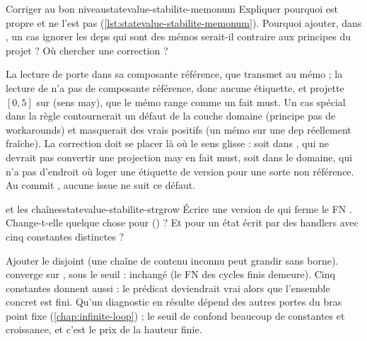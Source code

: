 \begin{exercice}{Corriger au bon niveau}{statevalue-stabilite-memonum}
  Expliquer pourquoi  est propre et
   ne l'est pas
  (\cref{lst:statevalue-stabilite-memonum}). Pourquoi ajouter, dans
  , un cas \og ignorer les deps qui sont des
  mémos\fg{} serait-il contraire aux principes du projet ? Où chercher une
  correction ?
\end{exercice}
\begin{solution}
  La lecture de  porte  dans sa composante
  référence, que  transmet au mémo ; la lecture de
   n'a pas de composante référence, donc aucune étiquette, et
   projette $[0,5]$ sur  (sens may), que
  le mémo range comme un fait must. Un cas spécial dans la règle
  contournerait un défaut de la couche domaine (principe \og pas de
  workarounds\fg{}) et masquerait des vrais positifs (un mémo sur une dep
  réellement fraîche). La correction doit se placer là où le sens glisse :
  soit dans , qui ne devrait pas convertir une
  projection may en fait must, soit dans le domaine, qui n'a pas d'endroit
  où loger une étiquette de version pour une sorte non référence. Au commit
  \snapshotCommit{}, aucune issue ne suit ce défaut.
\end{solution}

\begin{exercice}{ et les chaînes}{statevalue-stabilite-strgrow}
  Écrire une version de  qui ferme le FN .
  Change-t-elle quelque chose pour 
  () ? Et pour un état écrit par des
  handlers avec cinq constantes distinctes ?
\end{exercice}
\begin{solution}
  Ajouter le disjoint  (une chaîne de
  contenu inconnu peut grandir sans borne).  converge sur
  , sous le seuil : inchangé (le FN des cycles finis
  demeure). Cinq constantes donnent aussi  : le prédicat
  deviendrait vrai alors que l'ensemble concret est fini. Qu'un diagnostic en
  résulte dépend des autres portes du bras point fixe
  (\cref{chap:infinite-loop}) ; le seuil de  confond
  \og beaucoup de constantes\fg{} et \og croissance\fg{}, et c'est le prix
  de la hauteur finie.
\end{solution}

